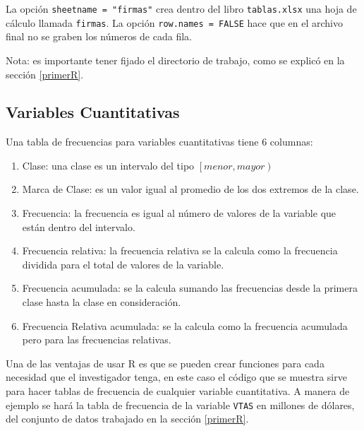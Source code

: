\documentclass[letterpaper,]{book}
\providecommand{\tightlist}{%
  \setlength{\itemsep}{0pt}\setlength{\parskip}{0pt}}
\begin{document}
La opción \texttt{sheetname\ =\ "firmas"} crea dentro del libro \texttt{tablas.xlsx} una hoja de cálculo llamada \texttt{firmas}. La opción \texttt{row.names\ =\ FALSE} hace que en el archivo final no se graben los números de cada fila.

Nota: es importante tener fijado el directorio de trabajo, como se explicó en la sección \ref{primerR}.

\hypertarget{variables-cuantitativas}{%
\subsection{Variables Cuantitativas}\label{variables-cuantitativas}}

Una tabla de frecuencias para variables cuantitativas tiene 6 columnas:

\begin{enumerate}
\def\labelenumi{\arabic{enumi}.}
\tightlist
\item
  Clase: una clase es un intervalo del tipo \(\left[ menor, mayor \right)\)
\item
  Marca de Clase: es un valor igual al promedio de los dos extremos de la clase.
\item
  Frecuencia: la frecuencia es igual al número de valores de la variable que están dentro del intervalo.
\item
  Frecuencia relativa: la frecuencia relativa se la calcula como la frecuencia dividida para el total de valores de la variable.
\item
  Frecuencia acumulada: se la calcula sumando las frecuencias desde la primera clase hasta la clase en consideración.
\item
  Frecuencia Relativa acumulada: se la calcula como la frecuencia acumulada pero para las frecuencias relativas.
\end{enumerate}

Una de las ventajas de usar R es que se pueden crear funciones para cada necesidad que el investigador tenga, en este caso el código que se muestra sirve para hacer tablas de frecuencia de cualquier variable cuantitativa. A manera de ejemplo se hará la tabla de frecuencia de la variable \texttt{VTAS} en millones de dólares, del conjunto de datos trabajado en la sección \ref{primerR}.
\end{document}
